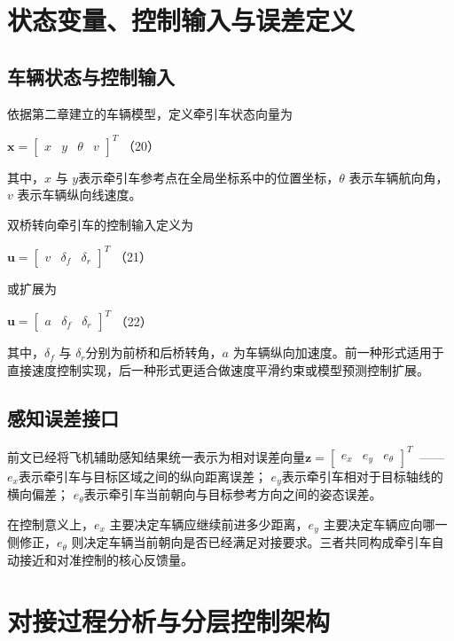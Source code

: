 \section{状态变量、控制输入与误差定义}

\subsection{车辆状态与控制输入}

依据第二章建立的车辆模型，定义牵引车状态向量为

\(\mathbf{x} = \begin{bmatrix}
x & y & \theta & v
\end{bmatrix}^{T}\) （20）

其中，\(x\) 与 \(y\)表示牵引车参考点在全局坐标系中的位置坐标，\(\theta\)
表示车辆航向角，\(v\) 表示车辆纵向线速度。

双桥转向牵引车的控制输入定义为

\(\mathbf{u} = \begin{bmatrix}
v & \delta_{f} & \delta_{r}
\end{bmatrix}^{T}\) （21）

或扩展为

\(\mathbf{u} = \begin{bmatrix}
a & \delta_{f} & \delta_{r}
\end{bmatrix}^{T}\) （22）

其中，\(\delta_{f}\) 与 \(\delta_{r}\)分别为前桥和后桥转角，\(a\)
为车辆纵向加速度。前一种形式适用于直接速度控制实现，后一种形式更适合做速度平滑约束或模型预测控制扩展。

\subsection{感知误差接口}

前文已经将飞机辅助感知结果统一表示为相对误差向量\(\mathbf{z} = \begin{bmatrix}
e_{x} & e_{y} & e_{\theta}
\end{bmatrix}^{T}\)
\(\ \)------\(e_{x}\)表示牵引车与目标区域之间的纵向距离误差；
\(e_{y}\)表示牵引车相对于目标轴线的横向偏差；
\(e_{\theta}\)表示牵引车当前朝向与目标参考方向之间的姿态误差。

在控制意义上，\(e_{x}\) 主要决定车辆应继续前进多少距离，\(e_{y}\)
主要决定车辆应向哪一侧修正，\(e_{\theta}\)
则决定车辆当前朝向是否已经满足对接要求。三者共同构成牵引车自动接近和对准控制的核心反馈量。

\section{对接过程分析与分层控制架构}

